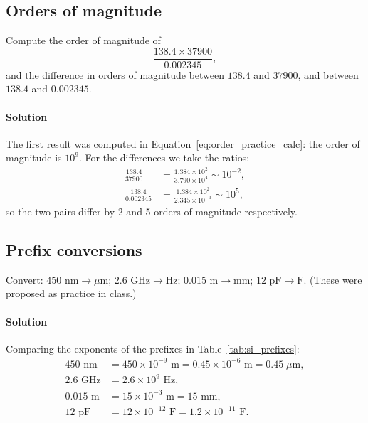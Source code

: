 \subsection{Orders of magnitude}
\label{ex:orders_of_magnitude}

Compute the order of magnitude of
\begin{equation*}
\frac{138.4 \times 37900}{0.002345},
\end{equation*}
and the difference in orders of magnitude between $138.4$ and $37900$, and between $138.4$ and $0.002345$.

\paragraph{Solution} The first result was computed in Equation~\eqref{eq:order_practice_calc}: the order of magnitude is $10^9$. For the differences we take the ratios:
\begin{align*}
\frac{138.4}{37900} &= \frac{1.384 \times 10^2}{3.790 \times 10^4} \sim 10^{-2}, \\[1ex]
\frac{138.4}{0.002345} &= \frac{1.384 \times 10^2}{2.345 \times 10^{-3}} \sim 10^{5},
\end{align*}
so the two pairs differ by 2 and 5 orders of magnitude respectively.

\subsection{Prefix conversions}
\label{ex:prefix_conversions}

Convert: $450\text{ nm} \to \mu\text{m}$; $2.6\text{ GHz} \to \text{Hz}$; $0.015\text{ m} \to \text{mm}$; $12\text{ pF} \to \text{F}$. (These were proposed as practice in class.)

\paragraph{Solution} Comparing the exponents of the prefixes in Table~\ref{tab:si_prefixes}:
\begin{align*}
450\text{ nm} &= 450 \times 10^{-9}\text{ m} = 0.45 \times 10^{-6}\text{ m} = 0.45\;\mu\text{m}, \\
2.6\text{ GHz} &= 2.6 \times 10^{9}\text{ Hz}, \\
0.015\text{ m} &= 15 \times 10^{-3}\text{ m} = 15\text{ mm}, \\
12\text{ pF} &= 12 \times 10^{-12}\text{ F} = 1.2 \times 10^{-11}\text{ F}.
\end{align*}

